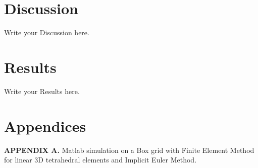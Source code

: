 \documentclass[12pt]{article}
\begin{document}
	
	\section{Discussion}
	Write your Discussion here.	
	
	\section{Results}
	Write your Results here.
	
	
	\section{Appendices}
	
	\textbf{APPENDIX A.} Matlab simulation on a Box grid with Finite Element Method for linear 3D tetrahedral elements and Implicit Euler Method.
	
\end{document}

